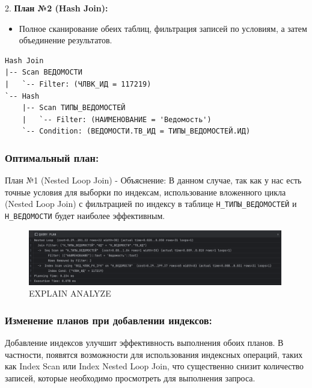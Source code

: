 \documentclass[14pt]{extreport}
\begin{document}
                2. \textbf{План №2 (Hash Join):}
                \begin{itemize}
                    \item Полное сканирование обеих таблиц, фильтрация записей по условиям, а затем объединение результатов.
                \end{itemize}
                \begin{verbatim}
Hash Join
|-- Scan ВЕДОМОСТИ
|   `-- Filter: (ЧЛВК_ИД = 117219)
`-- Hash
    |-- Scan ТИПЫ_ВЕДОМОСТЕЙ
    |   `-- Filter: (НАИМЕНОВАНИЕ = 'Ведомость')
    `-- Condition: (ВЕДОМОСТИ.ТВ_ИД = ТИПЫ_ВЕДОМОСТЕЙ.ИД)
                \end{verbatim}


                \subsubsection*{Оптимальный план:}
                    План №1 (Nested Loop Join) - Объяснение: В данном случае, так как у нас есть точные условия для выборки по индексам, использование вложенного цикла (Nested Loop Join) с фильтрацией по индексу в таблице \texttt{Н\_ТИПЫ\_ВЕДОМОСТЕЙ} и \texttt{Н\_ВЕДОМОСТИ} будет наиболее эффективным.

                    \begin{figure}[h]
                            \centering
                            \includegraphics[width=0.99\textwidth]{q1.png}
                            \caption{EXPLAIN ANALYZE}
                    \end{figure}


                \subsubsection*{Изменение планов при добавлении индексов:}
                    Добавление индексов улучшит эффективность выполнения обоих планов. В частности, появятся возможности для использования индексных операций, таких как Index Scan или Index Nested Loop Join, что существенно снизит количество записей, которые необходимо просмотреть для выполнения запроса.
\end{document}
